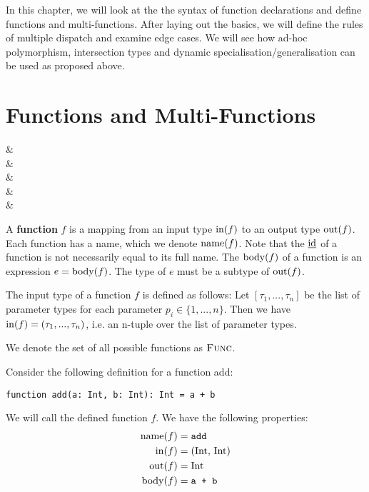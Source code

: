 \noindent In this chapter, we will look at the the syntax of function declarations and define functions and multi-functions. After laying out the basics, we will define the rules of multiple dispatch and examine edge cases. We will see how ad-hoc polymorphism, intersection types and dynamic specialisation/generalisation can be used as proposed above.



\section{Functions and Multi-Functions}

\begin{grammar}
 &\produce {} \\
 &\produce {} \\
 &\produce {} \\
&\alt {} \\
 &\produce {}
\end{grammar}

\noindent A \textbf{function} $f$ is a mapping from an input type $\operatorname{in}(f)$ to an output type $\operatorname{out}(f)$. Each function has a name, which we denote $\operatorname{name}(f)$. Note that the $\text{\underline{id}}$ of a function is not necessarily equal to its full name. The $\operatorname{body}(f)$ of a function is an expression $e = \operatorname{body}(f)$. The type of $e$ must be a subtype of $\operatorname{out}(f)$.

The input type of a function $f$ is defined as follows: Let $[\tau_1, ..., \tau_n]$ be the list of parameter types for each parameter $p_i \in \{ 1, ..., n \}$. Then we have $\operatorname{in}(f) = (\tau_1, ..., \tau_n)$, i.e. an n-tuple over the list of parameter types.

We denote the set of all possible functions as $\textsc{Func}$.

\begin{example}
	Consider the following definition for a function add:
	\begin{lstlisting}
function add(a: Int, b: Int): Int = a + b
	\end{lstlisting}
	
	\noindent We will call the defined function $f$. We have the following properties:
	\begin{align*}
		\operatorname{name}(f) &= \text{\texttt{add}} \\
		\operatorname{in}(f) &= \text{(Int, Int)} \\
		\operatorname{out}(f) &= \text{Int} \\
		\operatorname{body}(f) &= \text{\texttt{a + b}}
	\end{align*}
\end{example}

